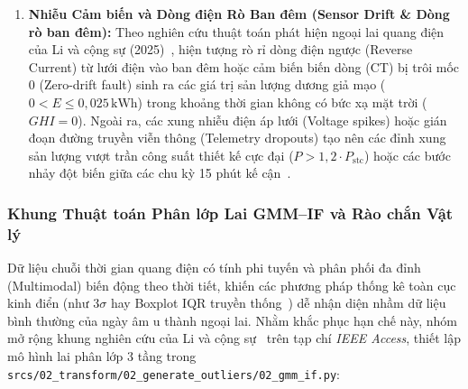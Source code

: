 \documentclass[12pt, a4paper]{report}
\begin{document}
\begin{enumerate}[label=\arabic*., leftmargin=*]
    \item \textbf{Nhiễu Cảm biến và Dòng điện Rò Ban đêm (Sensor Drift \& Dòng rò ban đêm):}
    Theo nghiên cứu thuật toán phát hiện ngoại lai quang điện của Li và cộng sự (2025)~\cite{li2025gmmif}, hiện tượng rò rỉ dòng điện ngược (Reverse Current) từ lưới điện vào ban đêm hoặc cảm biến biến dòng (CT) bị trôi mốc 0 (Zero-drift fault) sinh ra các giá trị sản lượng dương giả mạo ($0 < E \le 0{,}025\,\text{kWh}$) trong khoảng thời gian không có bức xạ mặt trời ($GHI = 0$). Ngoài ra, các xung nhiễu điện áp lưới (Voltage spikes) hoặc gián đoạn đường truyền viễn thông (Telemetry dropouts) tạo nên các đỉnh xung sản lượng vượt trần công suất thiết kế cực đại ($P > 1{,}2 \cdot P_{\text{stc}}$) hoặc các bước nhảy đột biến giữa các chu kỳ 15 phút kế cận~\cite{wimalaratne2022unisolar, li2025gmmif}.
\end{enumerate}

\subsubsection{Khung Thuật toán Phân lớp Lai GMM--IF và Rào chắn Vật lý}
Dữ liệu chuỗi thời gian quang điện có tính phi tuyến và phân phối đa đỉnh (Multimodal) biến động theo thời tiết, khiến các phương pháp thống kê toàn cục kinh điển (như $3\sigma$ hay Boxplot IQR truyền thống~\cite{tukey1977eda}) dễ nhận diện nhầm dữ liệu bình thường của ngày âm u thành ngoại lai. Nhằm khắc phục hạn chế này, nhóm mở rộng khung nghiên cứu của Li và cộng sự~\cite{li2025gmmif} trên tạp chí \textit{IEEE Access}, thiết lập mô hình lai phân lớp 3 tầng trong \texttt{srcs/02\_transform/02\_generate\_outliers/02\_gmm\_if.py}:
\end{document}
